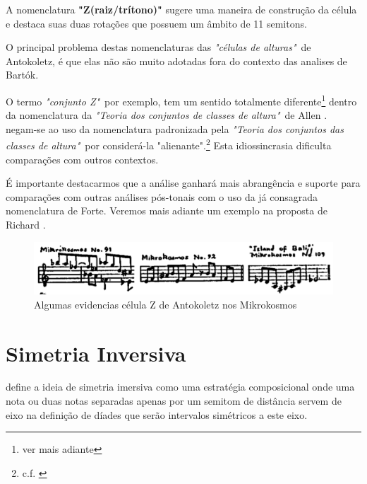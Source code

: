 \documentclass[
	12pt,				%
	openright,			%
	twoside,			%
	a4paper,			%
	english,			%
	french,				%
	spanish,			%
	brazil				%
	]{abntex2}
\begin{document}
A nomenclatura \textbf{"Z(raiz/trítono)"} sugere uma maneira de construção da célula e destaca suas duas rotações que possuem um âmbito de 11 semitons. 

O principal problema destas nomenclaturas das \textit{"células de alturas"}\ de Antokoletz, é que elas não são muito adotadas fora do contexto das analises de Bartók.

O termo \textit{"conjunto Z"}\, por exemplo, tem um sentido totalmente diferente\footnote{ver mais adiante} dentro da nomenclatura da  \textit{"Teoria dos conjuntos de classes de altura"}\ de Allen .  negam-se ao uso da nomenclatura padronizada pela \textit{"Teoria dos conjuntos das classes de altura"}\ por considerá-la "alienante".\footnote{c.f. \cite[ p.xiii]{susanni_antokoletz2012music}} Esta idiossincrasia dificulta comparações com outros contextos.

É importante destacarmos que a análise ganhará mais abrangência e suporte para comparações com outras análises pós-tonais com o uso da já consagrada nomenclatura de Forte. Veremos mais adiante um exemplo na proposta de Richard . 


\begin{figure}[!h]
	\caption{\label{fig_grafico}Algumas evidencias célula Z  de Antokoletz nos Mikrokosmos }
	\begin{center}
	    \includegraphics[scale=0.4]{intervalar/Lendvai_p52_ZCell.png}
	\end{center}
\end{figure}

 

\pagebreak
\section{Simetria Inversiva}

 define a ideia de simetria imersiva como uma estratégia composicional onde uma nota ou duas notas separadas apenas por um semitom de distância servem de eixo na definição de díades que serão intervalos simétricos a este eixo.
\end{document}
